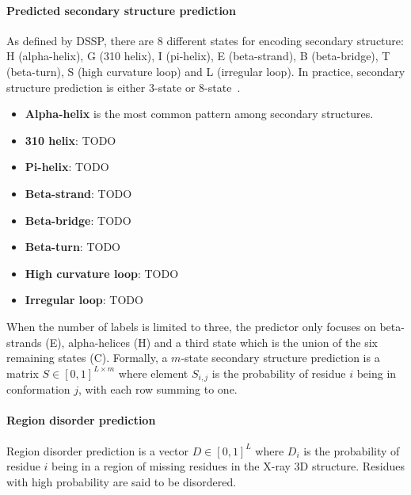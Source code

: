         \paragraph{Predicted secondary structure prediction}

            As defined by DSSP, there are 8 different states for encoding
            secondary structure: H (alpha-helix),
            G (310 helix), I (pi-helix), E (beta-strand), B (beta-bridge),
            T (beta-turn), S (high curvature loop) and L (irregular loop).
            In practice, secondary structure prediction is either 3-state
            or 8-state~\cite{wang2016raptorx}.
            \begin{itemize}
                \item \textbf{Alpha-helix} is the most common pattern among
                    secondary structures.
                \item \textbf{310 helix}:  TODO
                \item \textbf{Pi-helix}: TODO
                \item \textbf{Beta-strand}: TODO
                \item \textbf{Beta-bridge}: TODO
                \item \textbf{Beta-turn}: TODO
                \item \textbf{High curvature loop}: TODO
                \item \textbf{Irregular loop}: TODO
            \end{itemize}

            When the number of labels is limited to three,
            the predictor only focuses on beta-strands (E), alpha-helices (H)
            and a third state which is the union of the six remaining states (C).
            Formally, a $m$-state secondary structure prediction is a matrix
            $S \in [0, 1]^{L \times m}$ where element $S_{i,j}$ is the probability
            of residue $i$ being in conformation $j$,
            with each row summing to one.

        \paragraph{Region disorder prediction}

            Region disorder prediction is a vector $D \in [0, 1]^L$
            where $D_i$ is the probability of residue $i$ being in a region
            of missing residues in the X-ray 3D structure. Residues with high
            probability are said to be disordered.

